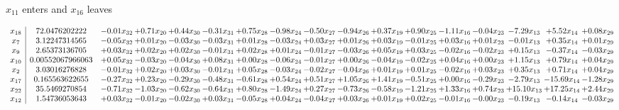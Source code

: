 \documentclass[9pt]{article}
\begin{document}
 $ x_{11} $ enters and $ x_{16} $ leaves 

 \[\begin{array}{c| c c@{\hskip 2pt} c@{\hskip 2pt} c@{\hskip 2pt} c@{\hskip 2pt} c@{\hskip 2pt} c@{\hskip 2pt} c@{\hskip 2pt} c@{\hskip 2pt} c@{\hskip 2pt} c@{\hskip 2pt} c@{\hskip 2pt} c@{\hskip 2pt} c@{\hskip 2pt} c@{\hskip 2pt} c@{\hskip 2pt} }
 x_{18}   &  72.0476202222 & -0.01 x_{32} & +  0.71 x_{20} & +  0.44 x_{30} & -0.31 x_{31} & +  0.75 x_{28} & -0.98 x_{24} & -0.50 x_{27} & -0.94 x_{26} & +  0.37 x_{19} & +  0.90 x_{25} & -1.11 x_{16} & -0.04 x_{23} & -7.29 x_{13} & +  5.52 x_{14} & +  0.08 x_{29}\\
 x_{7}   &  3.12247314565 & -0.05 x_{32} & +  0.01 x_{20} & -0.03 x_{30} & -0.03 x_{31} & +  0.01 x_{28} & -0.03 x_{24} & +  0.03 x_{27} & +  0.01 x_{26} & +  0.03 x_{19} & -0.01 x_{25} & +  0.03 x_{16} & +  0.01 x_{23} & -0.01 x_{13} & +  0.35 x_{14} & +  0.01 x_{29}\\
 x_{9}   &  2.65373136705 & +  0.03 x_{32} & +  0.02 x_{20} & +  0.02 x_{30} & -0.01 x_{31} & +  0.02 x_{28} & +  0.01 x_{24} & -0.01 x_{27} & -0.03 x_{26} & +  0.05 x_{19} & +  0.03 x_{25} & -0.02 x_{16} & -0.02 x_{23} & +  0.15 x_{13} & -0.37 x_{14} & -0.03 x_{29}\\
 x_{10}   &  0.00552067966063 & +  0.05 x_{32} & -0.03 x_{20} & -0.04 x_{30} & +  0.08 x_{31} & +  0.00 x_{28} & -0.06 x_{24} & -0.01 x_{27} & +  0.00 x_{26} & -0.04 x_{19} & -0.02 x_{25} & +  0.04 x_{16} & +  0.00 x_{23} & +  1.15 x_{13} & +  0.79 x_{14} & +  0.04 x_{29}\\
 x_{2}   &  3.03016276828 & -0.01 x_{32} & +  0.02 x_{20} & +  0.03 x_{30} & -0.01 x_{31} & +  0.05 x_{28} & -0.03 x_{24} & -0.02 x_{27} & -0.04 x_{26} & +  0.01 x_{19} & +  0.01 x_{25} & -0.02 x_{16} & +  0.03 x_{23} & +  0.35 x_{13} & +  0.71 x_{14} & +  0.04 x_{29}\\
 x_{17}   &  0.165563622655 & -0.27 x_{32} & +  0.23 x_{20} & -0.29 x_{30} & -0.48 x_{31} & -0.61 x_{28} & +  0.54 x_{24} & +  0.51 x_{27} & +  1.05 x_{26} & +  1.41 x_{19} & -0.51 x_{25} & +  0.00 x_{16} & -0.29 x_{23} & -2.79 x_{13} & -15.69 x_{14} & -1.28 x_{29}\\
 x_{22}   &  35.5469270854 & -0.71 x_{32} & -1.03 x_{20} & -0.62 x_{30} & -0.64 x_{31} & +  0.80 x_{28} & -1.49 x_{24} & +  0.27 x_{27} & -0.73 x_{26} & -0.58 x_{19} & -1.21 x_{25} & +  1.33 x_{16} & +  0.74 x_{23} & + 15.10 x_{13} & + 17.25 x_{14} & +  2.44 x_{29}\\
 x_{12}   &  1.54736053643 & +  0.03 x_{32} & -0.01 x_{20} & -0.02 x_{30} & +  0.03 x_{31} & -0.05 x_{28} & +  0.04 x_{24} & -0.04 x_{27} & +  0.03 x_{26} & +  0.01 x_{19} & +  0.02 x_{25} & -0.01 x_{16} & -0.00 x_{23} & -0.19 x_{13} & -0.14 x_{14} & -0.03 x_{29}\\

\end{array}\]
\end{document}
